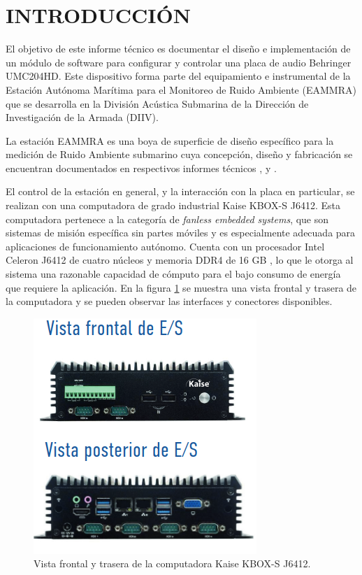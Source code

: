 \section{INTRODUCCIÓN}


El objetivo de este informe técnico es documentar el diseño e implementación de un módulo de software para configurar y controlar una placa de audio Behringer UMC204HD.  Este dispositivo forma parte del equipamiento e instrumental de la Estación Autónoma Marítima para el Monitoreo de Ruido Ambiente (EAMMRA) que se desarrolla en la División Acústica Submarina de la Dirección de Investigación de la Armada (DIIV). 

La estación EAMMRA es una boya de superficie de diseño específico para la medición de Ruido Ambiente submarino cuya concepción, diseño y fabricación se encuentran documentados en respectivos informes técnicos \citep{EAMMRA_ingConceptual}, \citep{EAMMRA_diseno} y \citep{EAMMRA_subsistemas}.  

El control de la estación en general, y la interacción con la placa en particular, se realizan con una computadora de grado industrial Kaise KBOX-S J6412. Esta computadora pertenece a la categoría de \textit{fanless embedded systems}, que son sistemas de misión específica sin partes móviles y es especialmente adecuada para aplicaciones de funcionamiento autónomo.  Cuenta con un procesador Intel Celeron J6412 de cuatro núcleos y memoria DDR4 de 16 GB \citep{kaise}, lo que le otorga al sistema una razonable capacidad de cómputo para el bajo consumo de energía que requiere la aplicación. En la figura \ref{fig:kaise} se muestra una vista frontal y trasera de la computadora y se pueden observar las interfaces y conectores disponibles.
 
\begin{figure}[htpb]
    \centering
    \includegraphics[width=.44\textwidth]{graficos/kaise.png}
    \caption{Vista frontal y trasera de la computadora Kaise KBOX-S J6412.}
    \label{fig:kaise}
\end{figure}


